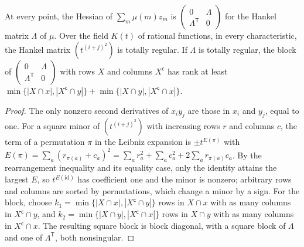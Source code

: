 \begin{lemma}
  \label{lem:lowerbounds-algebraic-poly-mul-hessian}
  \leanok
  At every point, the Hessian of $\sum_m\mu(m)z_m$ is
  $\left(\begin{smallmatrix}0&\Lambda\\\Lambda^{\mathsf T}&0\end{smallmatrix}\right)$
  for the Hankel matrix $\Lambda$ of $\mu$. Over the field $K(t)$ of rational
  functions, in every characteristic, the Hankel matrix $(t^{(i+j)^2})$ is
  totally regular. If $\Lambda$ is totally regular, the block of
  $\left(\begin{smallmatrix}0&\Lambda\\\Lambda^{\mathsf T}&0\end{smallmatrix}\right)$
  with rows $X$ and columns $X^{\mathsf c}$ has rank at least
  $\min\{|X\cap x|,|X^{\mathsf c}\cap y|\}+\min\{|X\cap y|,|X^{\mathsf c}\cap x|\}$.
\end{lemma}
\begin{proof}
  \leanok
  The only nonzero second derivatives of $x_iy_j$ are those in $x_i$ and
  $y_j$, equal to one. For a square minor of $(t^{(i+j)^2})$ with increasing
  rows $r$ and columns $c$, the term of a permutation $\pi$ in the Leibniz
  expansion is $\pm t^{E(\pi)}$ with
  $E(\pi)=\sum_a(r_{\pi(a)}+c_a)^2=\sum_ar_a^2+\sum_ac_a^2+2\sum_ar_{\pi(a)}c_a$.
  By the rearrangement inequality and its equality case, only the identity
  attains the largest $E$, so $t^{E(\mathrm{id})}$ has coefficient one and the
  minor is nonzero; arbitrary rows and columns are sorted by permutations,
  which change a minor by a sign. For the block, choose
  $k_1=\min\{|X\cap x|,|X^{\mathsf c}\cap y|\}$ rows in $X\cap x$ with as many
  columns in $X^{\mathsf c}\cap y$, and
  $k_2=\min\{|X\cap y|,|X^{\mathsf c}\cap x|\}$ rows in $X\cap y$ with as many
  columns in $X^{\mathsf c}\cap x$. The resulting square block is block
  diagonal, with a square block of $\Lambda$ and one of $\Lambda^{\mathsf T}$,
  both nonsingular.
\end{proof}

